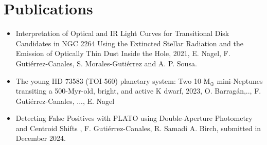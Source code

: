 \documentclass[11pt,a4paper]{article}
\begin{document}
	\section{Publications}
	\begin{itemize}
		\item Interpretation of Optical and IR Light Curves for Transitional Disk Candidates in NGC 2264 Using the Extincted Stellar Radiation and the Emission of Optically Thin Dust Inside the Hole, 2021, E. Nagel, F. Gutiérrez-Canales, S. Morales-Gutiérrez and A. P. Sousa.
		\item The young HD 73583 (TOI-560) planetary system: Two 10-M$_{\oplus}$ mini-Neptunes transiting a 500-Myr-old, bright, and active K dwarf, 2023, O. Barrag\'an,.., F. Gutiérrez-Canales, ..., E. Nagel
		\item Detecting False Positives with PLATO using Double-Aperture Photometry and Centroid Shifts , F. Gutiérrez-Canales, R. Samadi A. Birch, submitted in December 2024.
	\end{itemize}
	
\end{document}
